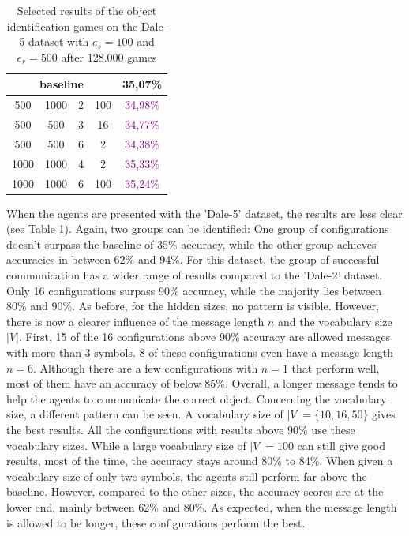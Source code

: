 \begin{table}[ht]
\begin{tabular}{cccc|c}
        \multicolumn{4}{c|}{baseline} & {35,07\%}                                                     \\\midrule
        {500}                         & {1000}    & {2} & {100} & \textcolor{purple}{34,98\%}         \\
        {500}                         & {500}     & {3} & {16}  & \textcolor{purple}{34,77\%}         \\
        {500}                         & {500}     & {6} & {2}   & \textcolor{purple}{34,38\%}         \\
        {1000}                        & {1000}    & {4} & {2}   & \textcolor{purple}{35,33\%}         \\
        {1000}                        & {1000}    & {6} & {100} & \textcolor{purple}{35,24\%}         \\
        \bottomrule
    \end{tabular}
    \caption{Selected results of the object identification games on the Dale-5 dataset with $e_s=100$ and $e_r=500$ after 128.000 games}
    \label{tab:results_discriminator_dale-5}
\end{table}

When the agents are presented with the 'Dale-5' dataset, the results are less clear (see Table \ref{tab:results_discriminator_dale-5}).
Again, two groups can be identified: One group of configurations doesn't surpass the baseline of 35\% accuracy, while the other group achieves accuracies in between 62\% and 94\%.
For this dataset, the group of successful communication has a wider range of results compared to the 'Dale-2' dataset.
Only 16 configurations surpass 90\% accuracy, while the majority lies between 80\% and 90\%.
As before, for the hidden sizes, no pattern is visible.
However, there is now a clearer influence of the message length $n$ and the vocabulary size $|V|$.
First, 15 of the 16 configurations above 90\% accuracy are allowed messages with more than 3 symbols.
8 of these configurations even have a message length $n = 6$.
Although there are a few configurations with $n = 1$ that perform well, most of them have an accuracy of below 85\%.
Overall, a longer message tends to help the agents to communicate the correct object.
Concerning the vocabulary size, a different pattern can be seen.
A vocabulary size of $|V| = \{10,16,50\}$ gives the best results.
All the configurations with results above 90\% use these vocabulary sizes.
While a large vocabulary size of $|V| = 100$ can still give good results, most of the time, the accuracy stays around 80\% to 84\%.
When given a vocabulary size of only two symbols, the agents still perform far above the baseline.
However, compared to the other sizes, the accuracy scores are at the lower end, mainly between 62\% and 80\%.
As expected, when the message length is allowed to be longer, these configurations perform the best.

